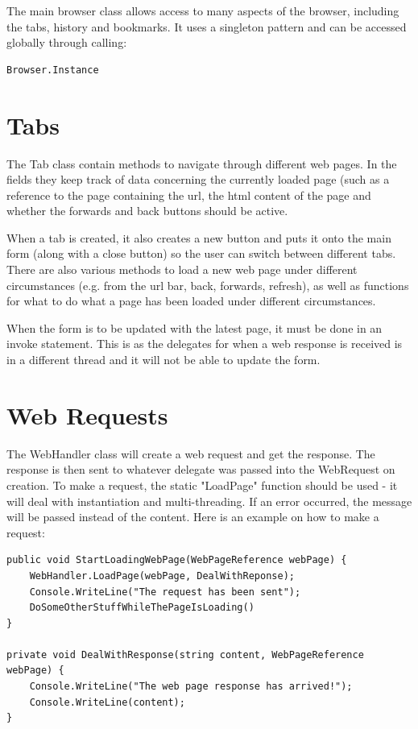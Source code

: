 \documentclass[11pt]{report}
\begin{document}
The main browser class allows access to many aspects of the browser, including the tabs, history and bookmarks.  It uses a singleton pattern and can be accessed globally through calling:
\begin{lstlisting}
Browser.Instance
\end{lstlisting}

\section{Tabs}

The Tab class contain methods to navigate through different web pages.  In the fields they keep track of data concerning the currently loaded page (such as a reference to the page containing the url, the html content of the page and whether the forwards and back buttons should be active.

When a tab is created, it also creates a new button and puts it onto the main form (along with a close button) so the user can switch between different tabs.  There are also various methods to load a new web page under different circumstances (e.g. from the url bar, back, forwards, refresh), as well as functions for what to do what a page has been loaded under different circumstances.

When the form is to be updated with the latest page, it must be done in an invoke statement.  This is as the delegates for when a web response is received is in a different thread and it will not be able to update the form.

\section{Web Requests}

The WebHandler class will create a web request and get the response.  The response is then sent to whatever delegate was passed into the WebRequest on creation.  To make a request, the static "LoadPage" function should be used - it will deal with instantiation and multi-threading.  If an error occurred, the message will be passed instead of the content. Here is an example on how to make a request:

\begin{lstlisting}
public void StartLoadingWebPage(WebPageReference webPage) {
	WebHandler.LoadPage(webPage, DealWithReponse);
	Console.WriteLine("The request has been sent");
	DoSomeOtherStuffWhileThePageIsLoading()
}

private void DealWithResponse(string content, WebPageReference webPage) {
	Console.WriteLine("The web page response has arrived!");
	Console.WriteLine(content);
}
\end{lstlisting}
\end{document}
